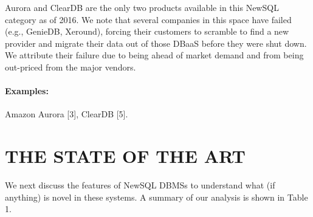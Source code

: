 \documentclass[a4paper,11pt,twoside,openright]{article}
\begin{document}
Aurora and ClearDB are the only two products available in this NewSQL
category as of 2016. We note that several companies in this space have
failed (e.g., GenieDB, Xeround), forcing their customers to scramble to
find a new provider and migrate their data out of those DBaaS before
they were shut down. We attribute their failure due to being ahead of
market demand and from being out-priced from the major vendors.

\paragraph*{Examples:} Amazon Aurora {[}3{]}, ClearDB {[}5{]}.

\hypertarget{the-state-of-the-art}{%
\section{THE STATE OF THE ART}\label{the-state-of-the-art}}

We next discuss the features of NewSQL DBMSs to understand what (if
anything) is novel in these systems. A summary of our analysis is shown
in Table 1.
\end{document}
